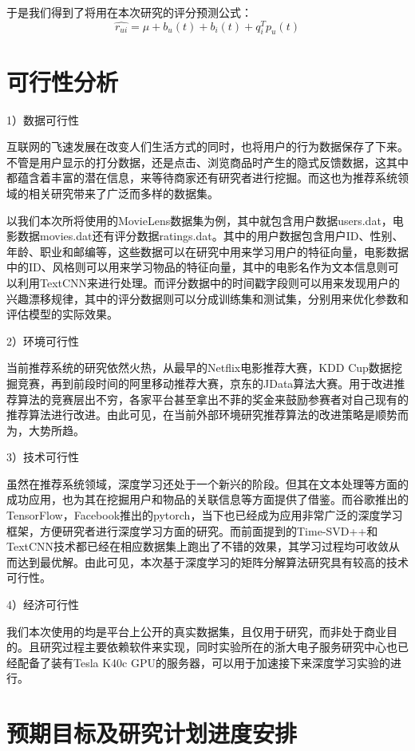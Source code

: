 于是我们得到了将用在本次研究的评分预测公式：
\begin{equation*}
\hat{r_{ui}} = \mu + b_u(t) + b_i(t) + q_i^Tp_u(t)
\end{equation*}
\chapter{可行性分析}
1）数据可行性

互联网的飞速发展在改变人们生活方式的同时，也将用户的行为数据保存了下来。不管是用户显示的打分数据，还是点击、浏览商品时产生的隐式反馈数据，这其中都蕴含着丰富的潜在信息，来等待商家还有研究者进行挖掘。而这也为推荐系统领域的相关研究带来了广泛而多样的数据集。

以我们本次所将使用的MovieLens数据集为例，其中就包含用户数据users.dat，电影数据movies.dat还有评分数据ratings.dat。其中的用户数据包含用户ID、性别、年龄、职业和邮编等，这些数据可以在研究中用来学习用户的特征向量，电影数据中的ID、风格则可以用来学习物品的特征向量，其中的电影名作为文本信息则可以利用TextCNN来进行处理。而评分数据中的时间戳字段则可以用来发现用户的兴趣漂移规律，其中的评分数据则可以分成训练集和测试集，分别用来优化参数和评估模型的实际效果。

2）环境可行性

当前推荐系统的研究依然火热，从最早的Netflix电影推荐大赛，KDD Cup数据挖掘竞赛，再到前段时间的阿里移动推荐大赛，京东的JData算法大赛。用于改进推荐算法的竞赛层出不穷，各家平台甚至拿出不菲的奖金来鼓励参赛者对自己现有的推荐算法进行改进。由此可见，在当前外部环境研究推荐算法的改进策略是顺势而为，大势所趋。

3）技术可行性

虽然在推荐系统领域，深度学习还处于一个新兴的阶段。但其在文本处理等方面的成功应用，也为其在挖掘用户和物品的关联信息等方面提供了借鉴。而谷歌推出的TensorFlow，Facebook推出的pytorch，当下也已经成为应用非常广泛的深度学习框架，方便研究者进行深度学习方面的研究。而前面提到的Time-SVD++和TextCNN技术都已经在相应数据集上跑出了不错的效果，其学习过程均可收敛从而达到最优解。由此可见，本次基于深度学习的矩阵分解算法研究具有较高的技术可行性。

4）经济可行性

我们本次使用的均是平台上公开的真实数据集，且仅用于研究，而非处于商业目的。且研究过程主要依赖软件来实现，同时实验所在的浙大电子服务研究中心也已经配备了装有Tesla K40c GPU的服务器，可以用于加速接下来深度学习实验的进行。
\chapter{预期目标及研究计划进度安排}

